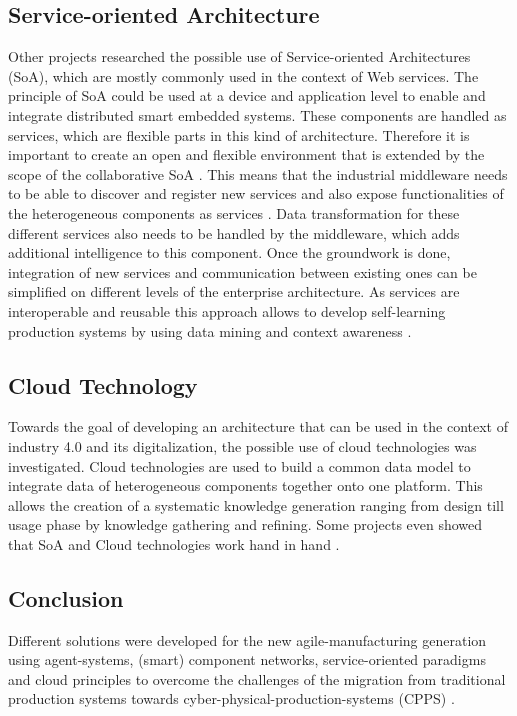 \documentclass[conference,compsoc,hidelinks]{IEEEtran}
\begin{document}
\subsection{Service-oriented Architecture}
Other projects researched the possible use of Service-oriented Architectures (SoA), which are mostly commonly used in the context of Web services. The principle of SoA could be used at a device and application level to enable and integrate distributed smart embedded systems. These components are handled as services, which are flexible parts in this kind of architecture. Therefore it is important to create an open and flexible environment that is extended by the scope of the collaborative SoA \cite{HarmonizedSystems}. This means that the industrial middleware needs to be able to discover and register new services and also expose functionalities of the heterogeneous components as services \cite{SpecPERFoRM}. Data transformation for these different services also needs to be handled by the middleware, which adds additional intelligence to this component. Once the groundwork is done, integration of new services and communication between existing ones can be simplified on different levels of the enterprise architecture. As services are interoperable and reusable this approach allows to develop self-learning production systems by using data mining and context awareness \cite{HarmonizedSystems}.


\subsection{Cloud Technology}
Towards the goal of developing an architecture that can be used in the context of industry 4.0 and its digitalization, the possible use of cloud technologies was investigated. Cloud technologies are used to build a common data model to integrate data of heterogeneous components together onto one platform. This allows the creation of a systematic knowledge generation ranging from design till usage phase by knowledge gathering and refining. Some projects even showed that SoA and Cloud technologies work hand in hand \cite{HarmonizedSystems}.  

\subsection{Conclusion}
Different solutions were developed for the new agile-manufacturing generation using agent-systems, (smart) component networks, service-oriented paradigms and cloud principles to overcome the challenges of the migration from traditional production systems towards cyber-physical-production-systems (CPPS) \cite{HarmonizedSystems}.
\end{document}
